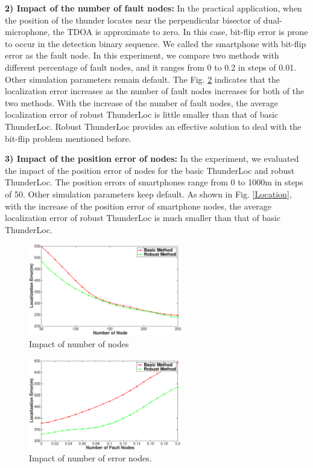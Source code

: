  \textbf{2) Impact of the number of fault nodes:}
In the practical application, when the position of the thunder locates near the perpendicular bisector of dual-microphone, 
the TDOA is approximate to zero. In this case, bit-flip error is prone to occur in the detection binary sequence. 
We called the smartphone with bit-flip error as the fault node.
In this experiment, we compare two methods with different percentage of fault nodes, and it ranges from 0 to 0.2 in steps of 0.01. 
Other simulation parameters remain default. The Fig. \ref{Faulty_Node} indicates that the localization error increases as the number of fault nodes increases for both of the two methods. 
With the increase of the number of fault nodes, the average localization error of robust ThunderLoc is little smaller than that of basic ThunderLoc.
Robust ThunderLoc provides an effective solution to deal with the bit-flip problem mentioned before.
  
 \textbf{3) Impact of the position error of nodes:}
In the experiment, we evaluated the impact of the position error of nodes for the basic ThunderLoc and robust ThunderLoc.
The position errors of smartphones range from 0 to 1000m in steps of 50. 
Other simulation parameters keep default. 
As shown in Fig. \ref{Location}, with the increase of the position error of smartphone nodes, the average localization error of robust ThunderLoc is much smaller than that of basic ThunderLoc.
    \begin{figure}[hptb]
            \setlength{\abovecaptionskip}{0pt}
            \centering
            \includegraphics[scale=1.4,height=4.0cm]{image/Node_Number.eps}
     \vspace{2mm}
            \caption{Impact of number of nodes}
            \label{Node_Number}
            \vspace{-6mm}
  \end{figure}

\begin{figure}[hptb]
            \setlength{\abovecaptionskip}{0pt}
            \centering
            \includegraphics[scale=1.4,height=4.0cm]{image/Faulty_Node.eps}
     \vspace{2mm}
            \caption{Impact of number of error nodes.}
            \label{Faulty_Node}
            \vspace{-6mm}
  \end{figure}

